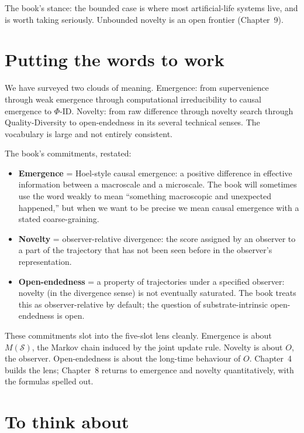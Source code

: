 The book's stance: the bounded case is where most artificial-life
systems live, and is worth taking seriously. Unbounded novelty is an
open frontier (Chapter~9).

\section{Putting the words to work}

We have surveyed two clouds of meaning. Emergence: from supervenience
through weak emergence through computational irreducibility to causal
emergence to $\Phi$-ID. Novelty: from raw difference through novelty
search through Quality-Diversity to open-endedness in its several
technical senses. The vocabulary is large and not entirely consistent.

The book's commitments, restated:

\begin{itemize}[leftmargin=1.5em,itemsep=2pt]
  \item \textbf{Emergence} = Hoel-style causal emergence: a positive
    difference in effective information between a macroscale and a
    microscale. The book will sometimes use the word weakly to mean
    ``something macroscopic and unexpected happened,'' but when we want
    to be precise we mean causal emergence with a stated coarse-graining.
  \item \textbf{Novelty} = observer-relative divergence: the score
    assigned by an observer to a part of the trajectory that has not
    been seen before in the observer's representation.
  \item \textbf{Open-endedness} = a property of trajectories under a
    specified observer: novelty (in the divergence sense) is not
    eventually saturated. The book treats this as observer-relative by
    default; the question of substrate-intrinsic open-endedness is
    open.
\end{itemize}

These commitments slot into the five-slot lens cleanly. Emergence is
about $M(\mathcal{S})$, the Markov chain induced by the joint update
rule. Novelty is about $O$, the observer. Open-endedness is about the
long-time behaviour of $O$. Chapter~4 builds the lens; Chapter~8 returns
to emergence and novelty quantitatively, with the formulas spelled out.

\section*{To think about}

